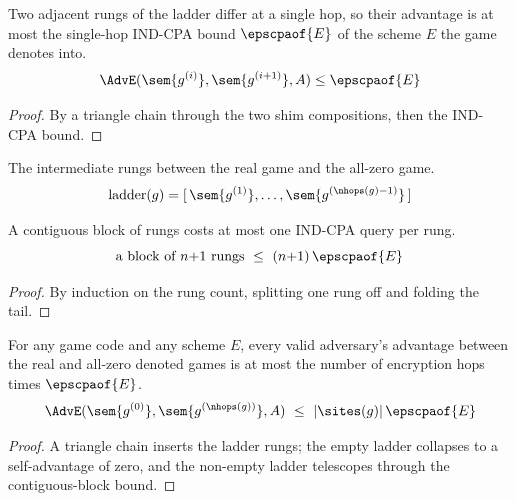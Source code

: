 \begin{lemma}
  \label{lem:advantage_hop}
  \rocqok
  Two adjacent rungs of the ladder differ at a single hop, so their advantage is
  at most the single-hop IND-CPA bound $\epscpaof{E}$ of the scheme $E$ the game
  denotes into.
  \[ \AdvE(\sem{g^{(i)}}, \sem{g^{(i+1)}}, A) \le \epscpaof{E} \]
\end{lemma}
\begin{proof}
  \rocqok
  By a triangle chain through the two shim compositions, then the IND-CPA bound.
\end{proof}

\begin{definition}
  \label{def:hybrid_ladder}
  \rocqok
  The intermediate rungs between the real game and the all-zero game.
  \[ \mathrm{ladder}(g) = [\, \sem{g^{(1)}}, \dots, \sem{g^{(\nhops(g)-1)}} \,] \]
\end{definition}

\begin{lemma}
  \label{lem:advantage_sum_ladder_le}
  \rocqok
  A contiguous block of rungs costs at most one IND-CPA query per rung.
  \[ \text{a block of } n{+}1 \text{ rungs} \ \le\ (n{+}1)\,\epscpaof{E} \]
\end{lemma}
\begin{proof}
  \rocqok
  By induction on the rung count, splitting one rung off and folding the tail.
\end{proof}

\begin{theorem}
  \label{thm:advantage_le}
  \rocqok
  For any game code and any scheme $E$, every valid adversary's advantage between
  the real and all-zero denoted games is at most the number of encryption hops
  times $\epscpaof{E}$.
  \[ \AdvE(\sem{g^{(0)}},\sem{g^{(\nhops(g))}},A) \ \le\ |\sites(g)|\,\epscpaof{E} \]
\end{theorem}
\begin{proof}
  \rocqok
  A triangle chain inserts the ladder rungs; the empty ladder collapses to a
  self-advantage of zero, and the non-empty ladder telescopes through the
  contiguous-block bound.
\end{proof}

